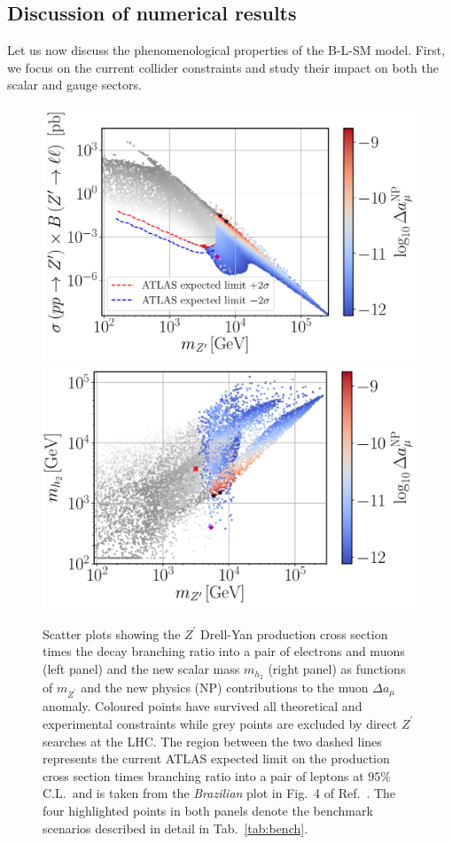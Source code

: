 \documentclass[a4paper,11pt]{article}
\renewcommand{\[}{\left[}
\renewcommand{\]}{\right]}
\begin{document}
\subsection{Discussion of numerical results}
\label{sec:discuss}

Let us now discuss the phenomenological properties of the B-L-SM model. First, we focus on the current collider constraints and study their impact on both the scalar and gauge sectors.
\begin{figure}[!htb]
	\centering
	\includegraphics[scale=0.37]{mZp_Xsec_Amu.pdf}
	\includegraphics[scale=0.37]{mZp_Mhp_Amu.pdf}
	\caption{Scatter plots showing the $Z^\prime$ Drell-Yan production cross section times the decay branching ratio into a pair of electrons and muons (left panel) and the new scalar mass $m_{h_2}$ (right panel) as functions of $m_{Z^\prime}$ and the new physics (NP) contributions to the muon $\Delta a_\mu$ anomaly. Coloured points have survived all theoretical and experimental constraints while grey points are excluded by direct $Z^\prime$ searches at the LHC. The region between the two dashed lines represents the current ATLAS expected limit on the production cross section times branching ratio into a pair of leptons at $95\%$ C.L.~and is taken from the \textit{Brazilian} plot in Fig.~4 of Ref.~\cite{Aaboud:2017buh}. The four highlighted points in both panels denote the benchmark scenarios described in detail in Tab.~\ref{tab:bench}.}
	\label{fig:Plots1}
\end{figure}	
\end{document}
